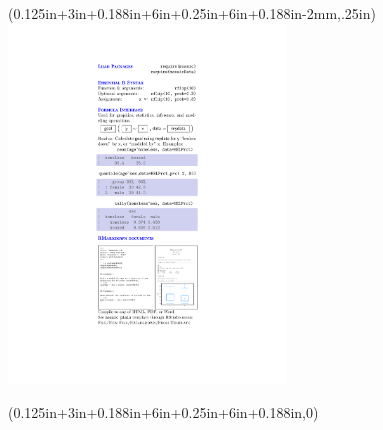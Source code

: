 \documentclass{article}
\newcommand{\trim}{0.125in}
\newcommand{\flap}{3in}
\newcommand{\wrap}{0.188in}
\newcommand{\cover}{6in}
\newcommand{\spine}{0.25in}
\begin{document}
\begin{textblock*}{3}(\trim+\flap+\wrap+\cover+\spine+\cover+\wrap-2mm,.25in) %
\includegraphics[width=2.9in]{frontflap.pdf}
\end{textblock*}

\begin{textblock*}{3}(\trim+\flap+\wrap+\cover+\spine+\cover+\wrap,0) %
\noindent{}
\end{textblock*}
\end{document}
